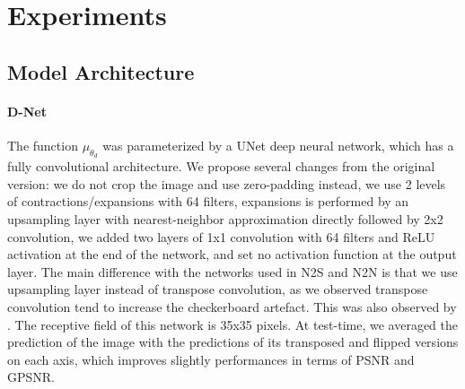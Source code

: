 \documentclass{article}
\begin{document}


\section{Experiments}
\subsection{Model Architecture}
\paragraph{D-Net}
The function $\mu_{\theta_d}$ was parameterized by a UNet \cite{ronneberger2015u} deep neural network, which has a fully convolutional architecture.
We propose several changes from the original version: we do not crop the image and use zero-padding instead, we use 2 levels of contractions/expansions with 64 filters, expansions is performed by an upsampling layer with nearest-neighbor approximation directly followed by 2x2 convolution, we added two layers of 1x1 convolution with 64 filters and ReLU activation at the end of the network, and set no activation function at the output layer.
The main difference with the networks used in N2S and N2N is that we use upsampling layer instead of transpose convolution, as we observed transpose convolution tend to increase the checkerboard artefact. This was also observed by \cite{kobayashi2020image}.
The receptive field of this network is 35x35 pixels.
At test-time, we averaged the prediction of the image with the predictions of its transposed and flipped versions on each axis, which improves slightly performances in terms of PSNR and GPSNR.
\end{document}
